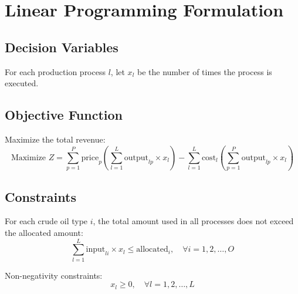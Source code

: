 \documentclass{article}
\begin{document}
\section*{Linear Programming Formulation}

\subsection*{Decision Variables}
For each production process \( l \), let \( x_l \) be the number of times the process is executed.

\subsection*{Objective Function}
Maximize the total revenue:
\[
\text{Maximize } Z = \sum_{p=1}^{P} \text{price}_p \left( \sum_{l=1}^{L} \text{output}_{lp} \times x_l \right) - \sum_{l=1}^{L} \text{cost}_l \left( \sum_{p=1}^{P} \text{output}_{lp} \times x_l \right)
\]

\subsection*{Constraints}
For each crude oil type \( i \), the total amount used in all processes does not exceed the allocated amount:
\[
\sum_{l=1}^{L} \text{input}_{li} \times x_l \leq \text{allocated}_i, \quad \forall i = 1, 2, \ldots, O
\]

Non-negativity constraints:
\[
x_l \geq 0, \quad \forall l = 1, 2, \ldots, L
\]
\end{document}
